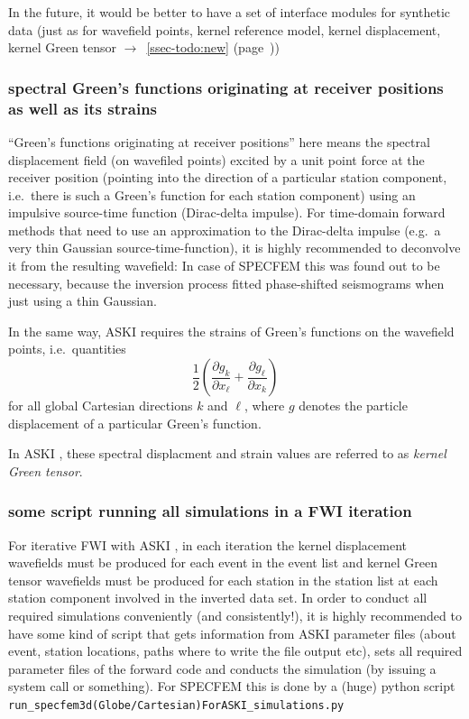 \documentclass[12pt,a4paper]{article}
\newcommand{\lcode}[1]{\nolinkurl{#1}}
\newcommand{\ASKI}{ {\ttfamily ASKI} }
\newcommand{\myaref}[1]{$\rightarrow$~\ref{#1} (page~\pageref{#1})}
\begin{document}
In the future, it would be better to have a set of interface modules for synthetic data (just as
for wavefield points, kernel reference model, kernel displacement, kernel Green tensor \myaref{ssec-todo:new})

\subsubsection{spectral Green's functions originating at receiver positions as well as its strains}
``Green's functions originating at receiver positions'' here means the spectral displacement field 
(on wavefiled points) excited by a
unit point force at the receiver position (pointing into the direction of a particular station component, i.e.\
there is such a Green's function for each station component) using an impulsive source-time function (Dirac-delta
impulse). For time-domain forward methods that need to use an approximation to the Dirac-delta impulse (e.g.\ a
very thin Gaussian source-time-function), it is highly recommended to deconvolve it from the resulting wavefield:
In case of SPECFEM this was found out to be necessary, because the inversion process fitted phase-shifted 
seismograms when just using a thin Gaussian.

In the same way, \ASKI{} requires the strains of Green's functions on the wavefield points, i.e.\ quantities
\[
\frac{1}{2}\left(\frac{\partial g_k}{\partial x_\ell} + \frac{\partial g_\ell}{\partial x_k}\right)
\]
for all global Cartesian directions $k$ and $\ell$, where $g$ denotes the particle displacement of a particular
Green's function.

In \ASKI{}, these spectral displacment and strain values are referred to as \emph{kernel Green tensor}.

\subsubsection{some script running all simulations in a FWI iteration}
For iterative FWI with \ASKI{}, in each iteration the kernel displacement wavefields must be produced for each
event in the event list and kernel Green tensor wavefields must be produced for each station in the station list
at each station component involved in the inverted data set. In order to conduct all required simulations 
conveniently (and consistently!), it is highly recommended to have some kind of script that gets information
from \ASKI{} parameter files (about event, station locations, paths where to write the file output etc), 
sets all required parameter files of the forward code and conducts the simulation (by issuing a system call
or something). For SPECFEM this is done by a (huge) python script 
\lcode{run_specfem3d(Globe/Cartesian)ForASKI_simulations.py}
\end{document}
